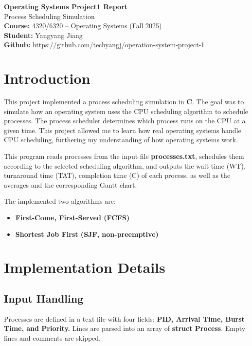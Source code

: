 \documentclass[12pt,a4paper]{article}
\begin{document}
\begin{titlepage}
    \centering
    \vspace*{3cm}
    {\Huge \textbf{Operating Systems Project1 Report}}\\[1.5cm]
    {\Large Process Scheduling Simulation}\\[1.5cm]
    \textbf{Course:} 4320/6320 -- Operating Systems (Fall 2025)\\[0.5cm]
    \textbf{Student:} Yangyang Jiang\\[0.5cm]
    \textbf{Github:} https://github.com/techyangj/operation-system-project-1\\[0.5cm]
    \vfill
    \vfill
\end{titlepage}

\section{Introduction}
This project implemented a process scheduling simulation in \textbf{C}. The goal was to simulate how an operating system uses the CPU scheduling algorithm to schedule processes. The process scheduler determines which process runs on the CPU at a given time. This project allowed me to learn how real operating systems handle CPU scheduling, furthering my understanding of how operating systems work. 

This program reads processes from the input file \textbf{processes.txt}, schedules them according to the selected scheduling algorithm, and outputs the wait time (WT), turnaround time (TAT), completion time (C) of each process, as well as the averages and the corresponding Gantt chart.

The implemented two algorithms are:
\begin{itemize}
    \item \textbf{First-Come, First-Served (FCFS)}
    \item \textbf{Shortest Job First (SJF, non-preemptive)}
\end{itemize}

\section{Implementation Details}

\subsection{Input Handling}
Processes are defined in a text file with four fields: \textbf{PID, Arrival Time, Burst Time, and Priority.} 
Lines are parsed into an array of \textbf{struct Process}. Empty lines and comments are skipped.
\end{document}
